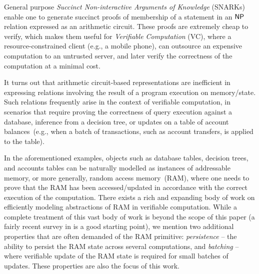 General purpose {\em Succinct Non-interactive Arguments of Knowledge} (SNARKs) enable one to generate succinct
proofs of membership of a statement in an $\mathsf{NP}$ relation expressed as an arithmetic circuit. These proofs are
extremely cheap to verify, which makes them useful for {\em Verifiable Computation} (VC), where a resource-constrained
client (e.g., a mobile phone), can outsource an expensive computation to an untrusted server, and later
verify the correctness of the computation at a minimal cost.

\smallskip

 It turns out that arithmetic circuit-based representations are inefficient in expressing relations involving the result of a program execution on memory/state. Such relations frequently arise in the context of verifiable computation, in scenarios that require proving the correctness of query execution against a database, inference from a decision tree, or updates on a table of account balances~(e.g., when a batch of transactions, such as account transfers, is applied to the table).

In the aforementioned examples, objects such as database tables, decision trees, and accounts tables can be naturally
modelled as instances of addressable memory, or more generally, random access memory~(RAM), where one needs to prove that the RAM has been accessed/updated in accordance with the correct execution of the computation. There exists a rich and expanding body of work on efficiently modeling abstractions of RAM in verifiable computation. While a complete treatment of this vast body of work is beyond
the scope of this paper (a fairly recent survey in \cite{WB15} is a good starting point), we mention two additional properties that are often demanded of the RAM primitive: {\em persistence} -- the ability to persist the RAM state across several computations, and {\em batching} --
where verifiable update of the RAM state is required for small batches of updates. These properties are also the focus of this work.


\smallskip

